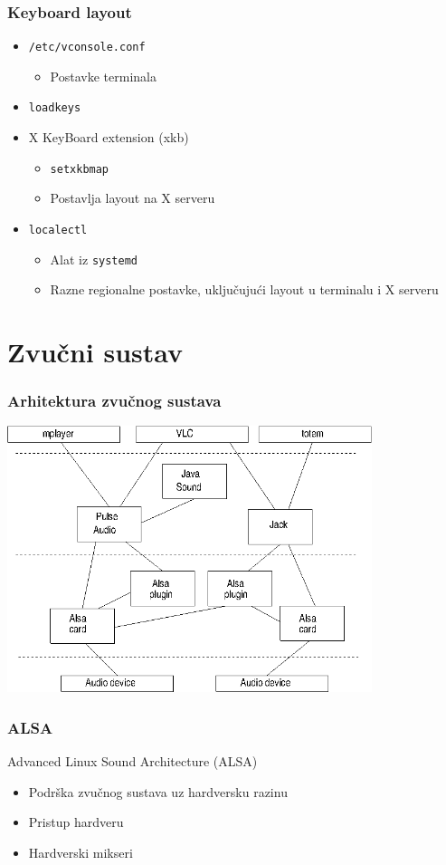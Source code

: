 \documentclass[t,table,usenames,dvipsnames]{beamer}
\begin{document}
\begin{frame}
	\frametitle{Keyboard layout}
	\begin{itemize}
		\item \texttt{/etc/vconsole.conf}
		\begin{itemize}
			\item Postavke terminala
		\end{itemize}
		\item \texttt{loadkeys}
		\item X KeyBoard extension (xkb)
		\begin{itemize}
			\item[] \texttt{setxkbmap}
			\item[] Postavlja layout na X serveru
		\end{itemize}
		\item \texttt{localectl}
		\begin{itemize}
			\item Alat iz \texttt{systemd}
			\item Razne regionalne postavke, uključujući layout u terminalu i X serveru
		\end{itemize}
	\end{itemize}
\end{frame}



\section{Zvučni sustav}


\begin{frame}
	\frametitle{Arhitektura zvučnog sustava}
	\centering
	\includegraphics[width=0.8\textwidth]{sound_arch.png}
\end{frame}


\begin{frame}
	\frametitle{ALSA}
	Advanced Linux Sound Architecture (ALSA)\\
	\vfill
	\begin{itemize}
		\item Podrška zvučnog sustava uz hardversku razinu
		\item Pristup hardveru
		\item Hardverski mikseri
	\end{itemize}
	\vfill
\end{frame}
\end{document}
